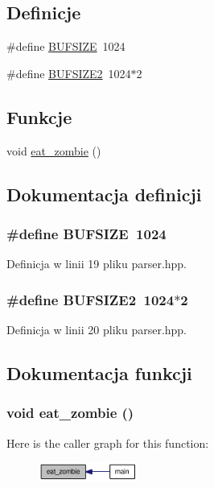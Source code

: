 \subsection*{Definicje}
\begin{CompactItemize}
\item 
\#define \hyperlink{a00008_eca034f67218340ecb2261a22c2f3dcd}{BUFSIZE}~1024
\item 
\#define \hyperlink{a00008_b46db07bcc5d1bb3dbc73f7be2592ee0}{BUFSIZE2}~1024$\ast$2
\end{CompactItemize}
\subsection*{Funkcje}
\begin{CompactItemize}
\item 
void \hyperlink{a00008_6c724feff242ad0cd599cdd458f73199}{eat\_\-zombie} ()
\end{CompactItemize}


\subsection{Dokumentacja definicji}
\hypertarget{a00008_eca034f67218340ecb2261a22c2f3dcd}{
\subsubsection[{BUFSIZE}]{\setlength{\rightskip}{0pt plus 5cm}\#define BUFSIZE~1024}}
\label{a00008_eca034f67218340ecb2261a22c2f3dcd}




Definicja w linii 19 pliku parser.hpp.\hypertarget{a00008_b46db07bcc5d1bb3dbc73f7be2592ee0}{
\subsubsection[{BUFSIZE2}]{\setlength{\rightskip}{0pt plus 5cm}\#define BUFSIZE2~1024$\ast$2}}
\label{a00008_b46db07bcc5d1bb3dbc73f7be2592ee0}




Definicja w linii 20 pliku parser.hpp.

\subsection{Dokumentacja funkcji}
\hypertarget{a00008_6c724feff242ad0cd599cdd458f73199}{
\subsubsection[{eat\_\-zombie}]{\setlength{\rightskip}{0pt plus 5cm}void eat\_\-zombie ()}}
\label{a00008_6c724feff242ad0cd599cdd458f73199}




Here is the caller graph for this function:\nopagebreak
\begin{figure}[H]
\begin{center}
\leavevmode
\includegraphics[width=92pt]{a00008_6c724feff242ad0cd599cdd458f73199_icgraph}
\end{center}
\end{figure}
